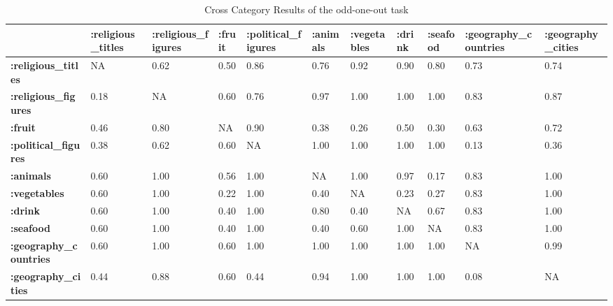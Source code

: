 \begin{table}
\centering
\caption{Cross Category Results of the odd-one-out task}
\label{label}
\begin{tabular}{lllllllllll}
\toprule
{} & :religious\_titles & :religious\_figures & :fruit & :political\_figures & :animals & :vegetables & :drink & :seafood & :geography\_countries & :geography\_cities \\
\midrule
\textbf{:religious\_titles   } &                NA &               0.62 &   0.50 &               0.86 &     0.76 &        0.92 &   0.90 &     0.80 &                 0.73 &              0.74 \\
\textbf{:religious\_figures  } &              0.18 &                 NA &   0.60 &               0.76 &     0.97 &        1.00 &   1.00 &     1.00 &                 0.83 &              0.87 \\
\textbf{:fruit              } &              0.46 &               0.80 &     NA &               0.90 &     0.38 &        0.26 &   0.50 &     0.30 &                 0.63 &              0.72 \\
\textbf{:political\_figures  } &              0.38 &               0.62 &   0.60 &                 NA &     1.00 &        1.00 &   1.00 &     1.00 &                 0.13 &              0.36 \\
\textbf{:animals            } &              0.60 &               1.00 &   0.56 &               1.00 &       NA &        1.00 &   0.97 &     0.17 &                 0.83 &              1.00 \\
\textbf{:vegetables         } &              0.60 &               1.00 &   0.22 &               1.00 &     0.40 &          NA &   0.23 &     0.27 &                 0.83 &              1.00 \\
\textbf{:drink              } &              0.60 &               1.00 &   0.40 &               1.00 &     0.80 &        0.40 &     NA &     0.67 &                 0.83 &              1.00 \\
\textbf{:seafood            } &              0.60 &               1.00 &   0.40 &               1.00 &     0.40 &        0.60 &   1.00 &       NA &                 0.83 &              1.00 \\
\textbf{:geography\_countries} &              0.60 &               1.00 &   0.60 &               1.00 &     1.00 &        1.00 &   1.00 &     1.00 &                   NA &              0.99 \\
\textbf{:geography\_cities   } &              0.44 &               0.88 &   0.60 &               0.44 &     0.94 &        1.00 &   1.00 &     1.00 &                 0.08 &                NA \\
\bottomrule
\end{tabular}
\end{table}

